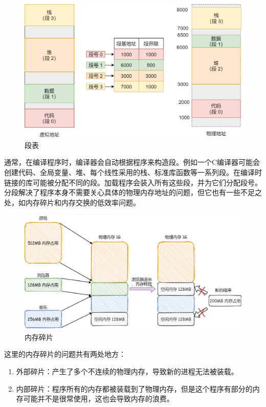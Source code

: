 \begin{figure}[H]
    \centering
    \includegraphics[scale=0.35]{img/C3/3-4/1.png}
    \caption{段表}
\end{figure}

通常，在编译程序时，编译器会自动根据程序来构造段。例如一个C编译器可能会创建代码、全局变量、堆、每个线性采用的栈、标准库函数等一系列段。在编译时链接的库可能被分配不同的段。加载程序会装入所有这些段，并为它们分配段号。\\

分段解决了程序本身不需要关心具体的物理内存地址的问题，但它也有一些不足之处，如内存碎片和内存交换的低效率问题。

\begin{figure}[H]
    \centering
    \includegraphics[scale=0.25]{img/C3/3-4/2.png}
    \caption{内存碎片}
\end{figure}

这里的内存碎片的问题共有两处地方：

\begin{enumerate}
    \item 外部碎片：产生了多个不连续的物理内存，导致新的进程无法被装载。

    \item 内部碎片：程序所有的内存都被装载到了物理内存，但是这个程序有部分的内存可能并不是很常使用，这也会导致内存的浪费。
\end{enumerate}

